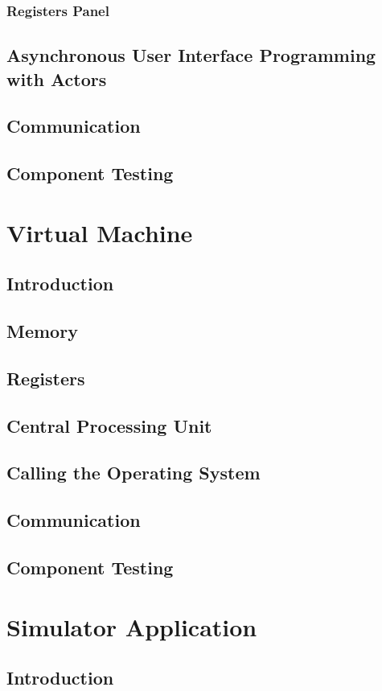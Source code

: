 \documentclass[a4paper,11pt]{report}
\begin{document}
\subsection{Registers Panel}
\section[Asynchronous UI Programming with Actors]{Asynchronous User Interface Programming with Actors}
\section{Communication}
\section{Component Testing}
\chapter{Virtual Machine}
\section{Introduction}
\section{Memory}
\section{Registers}
\section{Central Processing Unit}
\section{Calling the Operating System}
\section{Communication}
\section{Component Testing}
\chapter{Simulator Application}
\section{Introduction}
\end{document}
